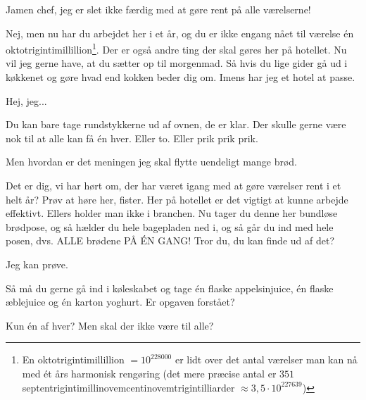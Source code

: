\documentclass[a4paper,11pt]{article}
\begin{document}
\begin{sketch}

 Jamen chef, jeg er slet ikke færdig med at gøre rent på alle værelserne!

 Nej, men nu har du arbejdet her i et år, og du er ikke engang nået til værelse én oktotrigintimillillion\footnote{En oktotrigintimillillion $= 10^{228000}$ er lidt over det antal værelser man kan nå med ét års harmonisk rengøring (det mere præcise antal er $351$ septentrigintimillinovemcentinovemtrigintilliarder $\approx3,5\cdot10^{227639}$)}. Der er også andre ting der skal gøres her på hotellet. Nu vil jeg gerne have, at du sætter op til morgenmad. Så hvis du lige gider gå ud i køkkenet og gøre hvad end kokken beder dig om. Imens har jeg et hotel at passe.


 Hej, jeg...

 Du kan bare tage rundstykkerne ud af ovnen, de er klar. Der skulle gerne være nok til at alle kan få én hver. Eller to. Eller prik prik prik.

 Men hvordan er det meningen jeg skal flytte uendeligt mange brød.

  Det er dig, vi har hørt om, der har været igang med at gøre værelser rent i et helt år? Prøv at høre her, fister. Her på hotellet er det vigtigt at kunne arbejde effektivt. Ellers holder man ikke i branchen. Nu tager du denne her bundløse brødpose, og så hælder du hele bagepladen ned i, og så går du ind med hele posen, dvs. ALLE brødene PÅ ÉN GANG! Tror du, du kan finde ud af det?

 Jeg kan prøve.


 Så må du gerne gå ind i køleskabet og tage én flaske appelsinjuice, én flaske æblejuice og én karton yoghurt. Er opgaven forstået?

 Kun én af hver? Men skal der ikke være til alle?


\end{sketch}
\end{document}
